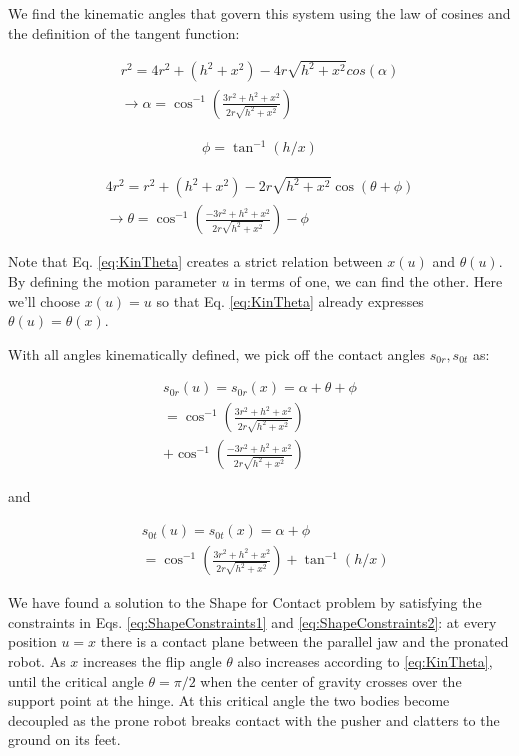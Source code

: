 \documentclass[letterpaper, 10 pt, conference]{ieeeconf}
\begin{document}
We find the kinematic angles that govern this system using the law of cosines and the definition of the tangent function:

\begin{align}
  r^2 = 4 r^2 + (h^2 + x^2) - 4r \sqrt{h^2 + x^2} cos(\alpha) \\
  \rightarrow \alpha = \cos^{-1} \left( \frac{3r^2 + h^2 + x^2}{2r \sqrt{h^2 + x^2}} \right)
\end{align}

\begin{align}
  \phi = \tan^{-1}(h/x)
\end{align}

\begin{align}
  4 r^2 = r^2 + (h^2 + x^2) - 2r \sqrt{h^2 + x^2} \cos(\theta + \phi) \\
  \rightarrow \theta = \cos^{-1} \left( \frac{-3r^2 + h^2 + x^2}{2r \sqrt{h^2 + x^2}} \right) - \phi \label{eq:KinTheta}
\end{align}

Note that Eq. \ref{eq:KinTheta} creates a strict relation between $x(u)$ and $\theta(u)$.
By defining the motion parameter $u$ in terms of one, we can find the other.
Here we'll choose $x(u) = u$ so that Eq. \ref{eq:KinTheta} already expresses $\theta(u) = \theta(x)$.

With all angles kinematically defined, we pick off the contact angles $s_{0r}, s_{0t}$ as:

\begin{align}
   s_{0r}(u) = s_{0r}(x) = \alpha + \theta + \phi \\
  = \cos^{-1} \left( \frac{3r^2 + h^2 + x^2}{2r \sqrt{h^2 + x^2}} \right) \\
  + \cos^{-1} \left( \frac{-3r^2 + h^2 + x^2}{2r \sqrt{h^2 + x^2}} \right)
\end{align}

and

\begin{align}
  & s_{0t}(u) = s_{0t}(x) = \alpha + \phi \\
  &= \cos^{-1} \left( \frac{3r^2 + h^2 + x^2}{2r \sqrt{h^2 + x^2}} \right) + \tan^{-1}(h/x)
\end{align}

We have found a solution to the Shape for Contact problem by satisfying the constraints in Eqs. \ref{eq:ShapeConstraints1} and \ref{eq:ShapeConstraints2}: at every position $u = x$ there is a contact plane between the parallel jaw and the pronated robot.
As $x$ increases the flip angle $\theta$ also increases according to \ref{eq:KinTheta}, until the critical angle $\theta = \pi/2$ when the center of gravity crosses over the support point at the hinge.
At this critical angle the two bodies become decoupled as the prone robot breaks contact with the pusher and clatters to the ground on its feet.
\end{document}
